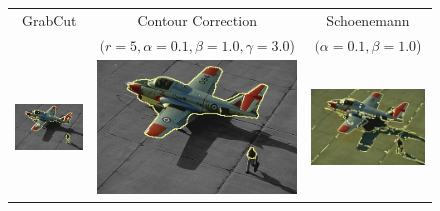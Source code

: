 \documentclass[runningheads]{llncs}
\begin{document}
\begin{figure}
	\center
	\begin{tabular}{ccc}
		GrabCut & Contour Correction & Schoenemann \\
		& $(r=5, \alpha=0.1, \beta=1.0, \gamma=3.0$) & $(\alpha=0.1, \beta=1.0$)\\
		\includegraphics[scale=0.2]{images/segmentation/bc/airplane2/gc-seg.png} &
		\includegraphics[scale=0.2]{images/segmentation/bc/airplane2/corrected-seg.png} &					\includegraphics[scale=0.2]{images/segmentation/schoenemann/airplane2/airplane2-seg.png}\\									

\end{tabular}
\end{figure}
\end{document}
